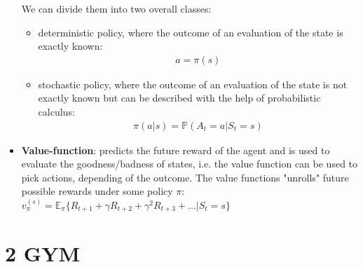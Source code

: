 \documentclass[a4paper, 11pt]{article}
\begin{document}
\begin{itemize}
     We can divide them into two overall classes:
    \begin{itemize}
    	\item deterministic policy, where the outcome of an evaluation of the state is exactly known: \\ 
    	\begin{align*}
    	a = \pi(s)
    	\end{align*}
    	\item stochastic policy, where the outcome of an evaluation of the state is not exactly known but can be described with the help of probabilistic calculus:\\
    	\begin{align*}
    		\pi( a | s) = \mathbb{P}(A_t =a | S_t = s)
    	\end{align*}
    \end{itemize}
    \vspace{0.5cm}
    \item \textbf{Value-function}: predicts the future reward of the agent and is used to evaluate the goodness/badness of states, i.e. the value function can be used to pick actions, depending of the outcome. The value functions "unrolls" future possible rewards under some policy $\pi$:\\
    $v_{\pi} ^{(s)} = \mathbb{E}_{\pi} \lbrace R_{t+1}+ \gamma R_{t+2} + \gamma ^2 R_{t+3}+... | S_t = s \rbrace$
\end{itemize}
\clearpage


\section*{2 GYM}

\lipsum[1]
\end{document}
